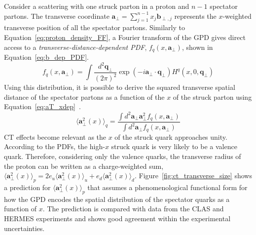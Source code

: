 Consider a scattering with one struck parton in a proton and $n-1$ spectator partons.
The transverse coordinate $\mathbf{a}_\perp = \sum_{j=1}^{n-1} x_j \mathbf{b}_{\perp,j}$ represents the $x$-weighted transverse position of all the spectator partons.
Similarly to Equation~\ref{eq:proton_density_FF}, a Fourier transform of the GPD gives direct access to a \textit{transverse-distance-dependent PDF}, $f_q\left(x,\mathbf{a}_\perp\right)$, shown in Equation~\ref{eq:b_dep_PDF}.
\begin{equation}
    \label{eq:b_dep_PDF}
    f_q\left(x,\mathbf{a}_\perp\right) = \int \frac{d^2\mathbf{q}_\perp}{\left(2\pi\right)^2} \exp{\left(-i \mathbf{a}_\perp\cdot\mathbf{q}_\perp\right)} H^q(x,0,\mathbf{q}_\perp)
\end{equation}
Using this distribution, it is possible to derive the squared transverse spatial distance of the spectator partons as a function of the $x$ of the struck parton using Equation~\ref{eq:aT_xdep}~\cite{Brodsky:CT}.
\begin{equation}
    \label{eq:aT_xdep}
    \langle\mathbf{a}_\perp^2(x)\rangle_q = \frac{\int d^2\mathbf{a}_\perp \mathbf{a}_\perp^2 f_q\left(x,\mathbf{a}_\perp\right)}{\int  d^2\mathbf{a}_\perp f_q\left(x,\mathbf{a}_\perp\right)}
\end{equation}
CT effects become relevant as the $x$ of the struck quark approaches unity. According to the PDFs, the high-$x$ struck quark is very likely to be a valence quark.
Therefore, considering only the valence quarks, the transverse radius of the proton can be written as a charge-weighted sum, $\langle\mathbf{a}_\perp^2(x)\rangle_p = 2 e_u \langle\mathbf{a}_\perp^2(x)\rangle_u + e_d \langle\mathbf{a}_\perp^2(x)\rangle_d$.
Figure~\ref{fig:ct_transverse_size} shows a prediction for $\langle\mathbf{a}_\perp^2(x)\rangle_p$ that assumes a phenomenological functional form for how the GPD encodes the spatial distribution of the spectator quarks as a function of $x$. The prediction is compared with data from the CLAS and HERMES experiments and shows good agreement within the experimental uncertainties.

